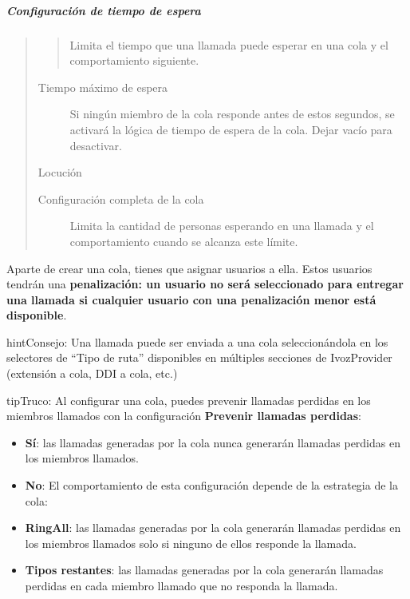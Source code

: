 \documentclass[letterpaper,10pt,spanish]{sphinxmanual}
\begin{document}
\subparagraph{Configuración de tiempo de espera}
\label{administration_portal/client/vpbx/routing_endpoints/queues:timeout-configuration}\begin{quote}
\begin{quote}

Limita el tiempo que una llamada puede esperar en una cola y el comportamiento siguiente.
\end{quote}
\begin{description}
\item[{Tiempo máximo de espera}] \leavevmode
Si ningún miembro de la cola responde antes de estos segundos, se activará la lógica de tiempo de espera de la cola. Dejar vacío para desactivar.

\end{description}

Locución
\begin{description}
\item[{Configuración completa de la cola}] \leavevmode
Limita la cantidad de personas esperando en una llamada y el comportamiento cuando se alcanza este límite.

\end{description}
\end{quote}

Aparte de crear una cola, tienes que asignar usuarios a ella. Estos usuarios tendrán una \textbf{penalización: un usuario no será seleccionado para entregar una llamada si cualquier usuario con una penalización menor está disponible}.

\begin{notice}{hint}{Consejo:}
Una llamada puede ser enviada a una cola seleccionándola en los selectores de ``Tipo de ruta'' disponibles en múltiples secciones de IvozProvider (extensión a cola, DDI a cola, etc.)
\end{notice}

\begin{notice}{tip}{Truco:}
Al configurar una cola, puedes prevenir llamadas perdidas en los miembros llamados con la configuración \textbf{Prevenir llamadas perdidas}:
\begin{itemize}
\item {} 
\textbf{Sí}: las llamadas generadas por la cola nunca generarán llamadas perdidas en los miembros llamados.

\item {} 
\textbf{No}: El comportamiento de esta configuración depende de la estrategia de la cola:

\item {} 
\textbf{RingAll}: las llamadas generadas por la cola generarán llamadas perdidas en los miembros llamados solo si ninguno de ellos responde la llamada.

\item {} 
\textbf{Tipos restantes}: las llamadas generadas por la cola generarán llamadas perdidas en cada miembro llamado que no responda la llamada.

\end{itemize}
\end{notice}
\end{document}
